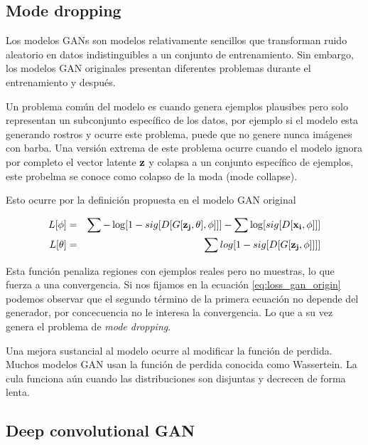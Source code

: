 \documentclass[letterpaper,12pt,oneside]{book}
\begin{document}
                \subsection{Mode dropping}
                    Los modelos GANs son modelos relativamente sencillos que transforman ruido aleatorio en datos indistinguibles a un conjunto de entrenamiento. Sin embargo, los modelos GAN originales presentan diferentes problemas durante el entrenamiento y después. 

                    Un problema común del modelo es cuando genera ejemplos plausibes pero solo representan un subconjunto específico de los datos, por ejemplo si el modelo esta generando rostros y ocurre este problema, puede que no genere nunca imágenes con barba. Una versión extrema de este problema ocurre cuando el modelo ignora por completo el vector latente ${\bf z}$ y colapsa a un conjunto específico de ejemplos, este probelma se conoce como colapso de la moda (mode collapse).

                    Esto ocurre por la definición propuesta en el modelo GAN original 
                    
                    \begin{eqnarray}
                        \label{eq:loss_gan_origin}
                        L[\phi] &=& \sum -\log[1 - sig[D[G[{\bf z_j, \theta}],\phi]]] - \sum \log[sig[D[{\bf x_i}, \phi]]]\\
                        L[\theta] &=& \sum log[1 - sig[D[G[{\bf z_j}, \phi]]]]
                    \end{eqnarray}

                    Esta función penaliza regiones con ejemplos reales pero no muestras, lo que fuerza a una convergencia. Si nos fijamos en la ecuación \ref{eq:loss_gan_origin} podemos observar que el segundo término de la primera ecuación no depende del generador, por concecuencia no le interesa la convergencia. Lo que a su vez genera el problema de {\it mode dropping}.

                    Una mejora sustancial al modelo ocurre al modificar la función de perdida. Muchos modelos GAN usan la función de perdida conocida como Wassertein. La cula funciona aún cuando las distribuciones son disjuntas y decrecen de forma lenta. 

                    

                \subsection{Deep convolutional GAN}
\end{document}
